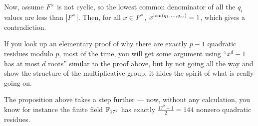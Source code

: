 Now, assume $F^\times$ is not cyclic, so the lowest common denominator of all the $q_i$ values are
less than $|F^\times|$.
Then, for all $x \in F^\times$, $x^{\operatorname*{lcm}(q_1, \dots, q_m)} = 1$, which gives a contradiction.

\begin{remark}
	If you look up an elementary proof of why there are exactly $p-1$ quadratic residues modulo $p$,
	most of the time, you will get some argument using ``$x^d-1$ has at most $d$ roots'' similar to
	the proof above, but by not going all the way and show the structure of the multiplicative
	group, it hides the spirit of what is really going on.

	The proposition above takes a step further --- now, without any calculation, you know
	for instance the finite field $\mathbb F_{17^2}$ has exactly $\frac{17^2-1}{2} = 144$ nonzero
	quadratic residues.
\end{remark}

